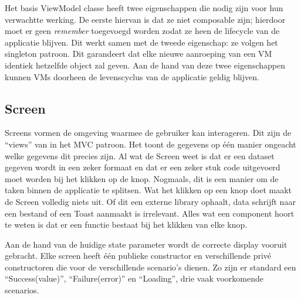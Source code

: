 \documentclass{report}
\begin{document}
Het basis ViewModel classe heeft twee eigenschappen die nodig zijn voor hun verwachtte werking.
De eerste hiervan is dat ze niet composable zijn; hierdoor moet er geen \textit{remember} toegevoegd worden zodat ze heen de lifecycle van de applicatie blijven.
Dit werkt samen met de tweede eigenschap: ze volgen het singleton patroon. Dit garandeert dat elke nieuwe aanroeping van een VM identiek hetzelfde object zal geven.
Aan de hand van deze twee eigenschappen kunnen VMs doorheen de levenscyclus van de applicatie geldig blijven.




\subsection{Screen}
Screens vormen de omgeving waarmee de gebruiker kan interageren. Dit zijn de ``views'' van in het MVC patroon.
Het toont de gegevens op één manier ongeacht welke gegevens dit precies zijn. 
Al wat de Screen weet is dat er een dataset gegeven wordt in een zeker formaat en dat er een zeker stuk code uitgevoerd moet worden bij het klikken op de knop.
Nogmaals, dit is een manier om de taken binnen de applicatie te splitsen. Wat het klikken op een knop doet maakt de Screen volledig niets uit. Of dit een externe library ophaalt, data schrijft naar een bestand of een Toast aanmaakt is irrelevant.
Alles wat een component hoort te weten is dat er een functie bestaat bij het klikken van elke knop.

Aan de hand van de huidige state parameter wordt de correcte display vooruit gebracht.
Elke screen heeft één publieke constructor en verschillende privé constructoren die voor de verschillende scenario's dienen.
Zo zijn er standard een ``Success(value)'', ``Failure(error)'' en ``Loading'', drie vaak voorkomende scenarios.
\end{document}
